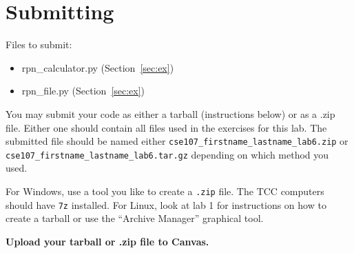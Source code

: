 \documentclass[11pt]{cselabheader}
\begin{document}
\pagebreak
\section{Submitting}

Files to submit:
\begin{itemize}
  \item rpn\_calculator.py (Section~\ref{sec:ex})
  \item rpn\_file.py (Section~\ref{sec:ex})
\end{itemize}

You may submit your code as either a tarball (instructions below) or as a .zip
file. Either one should contain all files used in the exercises for this lab.
The submitted file should be named either
\texttt{cse107\_firstname\_lastname\_lab6.zip} or
\texttt{cse107\_firstname\_lastname\_lab6.tar.gz} depending on which method you
used.

For Windows, use a tool you like to create a \texttt{.zip} file. The TCC
computers should have \texttt{7z} installed. For Linux, look at lab 1 for
instructions on how to create a tarball or use the ``Archive Manager'' graphical
tool.

\begin{center}
  \textbf{Upload your tarball or .zip file to Canvas.}
\end{center}
\end{document}
